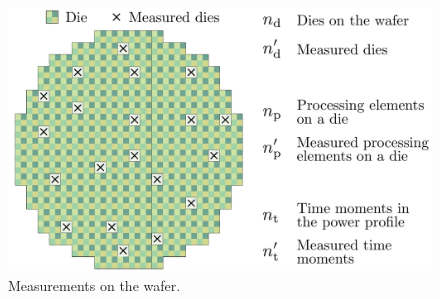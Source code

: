 \begin{figure}
  \centering
  \includegraphics[width=0.8\linewidth]{include/figures/wafer-measured.pdf}
  \caption{Measurements on the wafer.}
  \vspace{-1.5em}
\end{figure}

